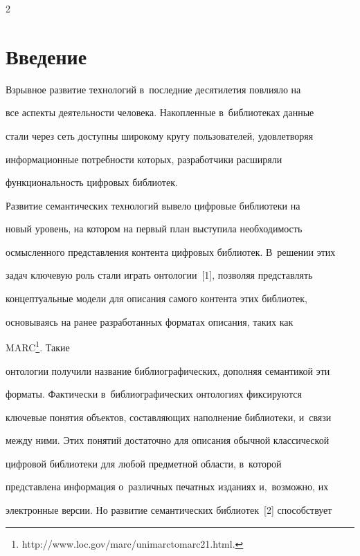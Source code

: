 \begin{multicols}{2}



\label{st\stat}



\section{Введение}



     Взрывное развитие технологий в~последние десятилетия повлияло на 

все аспекты деятельности человека. Накопленные в~библиотеках данные 

стали через сеть доступны широкому кругу пользователей, удовлетворяя 

информационные потребности которых, разработчики расширяли 

функциональность цифровых библиотек. 

     

     Развитие семантических технологий вывело циф\-ро\-вые библиотеки на 

новый уровень, на котором на первый план выступила необходимость 

осмыс\-лен\-но\-го представления контента цифровых биб\-лио\-тек. В~решении этих 

задач ключевую роль стали играть онтологии~[1], позволяя представлять 

концептуальные модели для описания самого контента этих библиотек, 

основываясь на ранее разработанных форматах описания, таких как 

MARC\footnote[3]{{\sf http://www.loc.gov/marc/unimarctomarc21.html.}}. Такие 

онтологии получили название библиографических, дополняя семантикой эти 

форматы. Фактически в~библиографических онтологиях фиксируются 

ключевые понятия объектов, составляющих наполнение библиотеки, и~связи 

между ними. Этих понятий достаточно для описания обычной классической 

цифровой библиотеки для любой предметной области, в~которой 

представлена информация о~различных печатных изданиях и,~возможно, их 

электронные версии. Но развитие семантических библиотек~[2] способствует 


\end{multicols}
